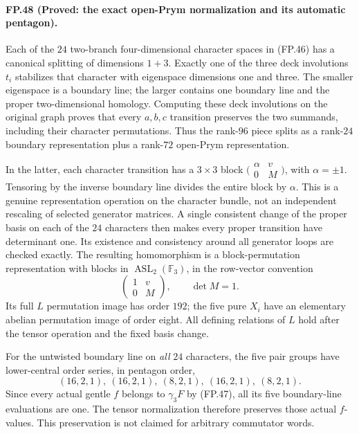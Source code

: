 \paragraph{FP.48 (Proved: the exact open-Prym normalization and its automatic pentagon).}
Each of the $24$ two-branch four-dimensional character
spaces in (FP.46) has a canonical splitting of dimensions
$1+3$. Exactly one of the three deck involutions $t_i$
stabilizes that character with eigenspace dimensions one
and three. The smaller eigenspace is a boundary line; the
larger contains one boundary line and the proper
two-dimensional homology. Computing these deck involutions
on the original graph proves that every $a,b,c$ transition
preserves the two summands, including their character
permutations. Thus the rank-$96$ piece splits as a
rank-$24$ boundary representation plus a rank-$72$ open-Prym
representation.

In the latter, each character transition has a $3\times3$
block $\bigl(\begin{smallmatrix}\alpha&v\\0&M\end{smallmatrix}\bigr)$,
with $\alpha=\pm1$. Tensoring by the inverse boundary line
divides the entire block by $\alpha$. This is a genuine
representation operation on the character bundle, not an
independent rescaling of selected generator matrices. A
single consistent change of the proper basis on each of the
$24$ characters then makes every proper transition have
determinant one. Its existence and consistency around all
generator loops are checked exactly. The resulting
homomorphism is a block-permutation representation with
blocks in $\operatorname{ASL}_2(\mathbb F_3)$, in the
row-vector convention
\[
                  \begin{pmatrix}1&v\\0&M\end{pmatrix},
                         \qquad \det M=1.
\]
Its full $L$ permutation image has order $192$; the five
pure $X_i$ have an elementary abelian permutation image of
order eight. All defining relations of $L$ hold after the
tensor operation and the fixed basis change.

For the untwisted boundary line on \emph{all} $24$ characters,
the five pair groups have lower-central order series, in
pentagon order,
\[
        (16,2,1),\ (16,2,1),\ (8,2,1),\
        (16,2,1),\ (8,2,1).
\]
Since every actual gentle $f$ belongs to $\gamma_3F$ by
(FP.47), all its five boundary-line evaluations are one.
The tensor normalization therefore preserves those actual
$f$-values. This preservation is not claimed for arbitrary
commutator words.

